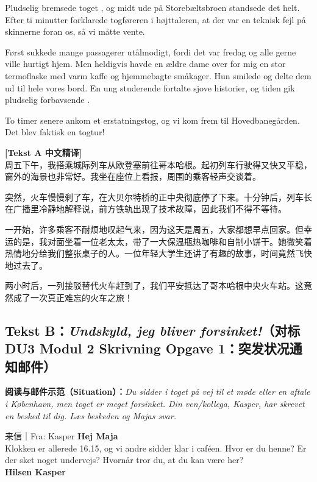 Pludselig bremsede toget , og midt ude på Storebæltsbroen standsede det helt. Efter ti minutter forklarede togføreren  i højttaleren, at der var en teknisk fejl på skinnerne foran os, så vi måtte vente.

Først sukkede mange passagerer utålmodigt, fordi det var fredag og alle gerne ville hurtigt hjem. Men heldigvis havde en ældre dame over for mig en stor termoflaske med varm kaffe og hjemmebagte småkager. Hun smilede og delte dem  ud til hele vores bord. En ung studerende fortalte sjove historier, og tiden gik pludselig forbavsende .

To timer senere ankom et erstatningstog, og vi kom  frem til Hovedbanegården. Det blev faktisk en  togtur!

\begin{transbox}
\small
\textbf{\color{NCDTeal}[Tekst A 中文精译]}\\
周五下午，我搭乘城际列车从欧登塞前往哥本哈根。起初列车行驶得又快又平稳，窗外的海景也非常好。我坐在座位上看报，周围的乘客轻声交谈着。

突然，火车慢慢刹了车，在大贝尔特桥的正中央彻底停了下来。十分钟后，列车长在广播里冷静地解释说，前方铁轨出现了技术故障，因此我们不得不等待。

一开始，许多乘客不耐烦地叹起气来，因为这天是周五，大家都想早点回家。但幸运的是，我对面坐着一位老太太，带了一大保温瓶热咖啡和自制小饼干。她微笑着热情地分给我们整张桌子的人。一位年轻大学生还讲了有趣的故事，时间竟然飞快地过去了。

两小时后，一列接驳替代火车赶到了，我们平安抵达了哥本哈根中央火车站。这竟然成了一次真正难忘的火车之旅！
\end{transbox}

\subsection*{Tekst B：\textit{Undskyld, jeg bliver forsinket!}（对标 DU3 Modul 2 Skrivning Opgave 1：突发状况通知邮件）}

\textbf{阅读与邮件示范（Situation）：}\textit{Du sidder i toget på vej til et møde eller en aftale i København, men toget er meget forsinket. Din ven/kollega, Kasper, har skrevet en besked til dig. Læs beskeden og Majas svar.}

\vspace{0.3em}
\begin{emailbox}{来信｜Fra: Kasper}
\textbf{Hej Maja}\\
Klokken er allerede 16.15, og vi andre sidder klar i caféen. Hvor er du henne? Er der sket noget undervejs? Hvornår tror du, at du kan være her?\\
\textbf{Hilsen Kasper}
\end{emailbox}

